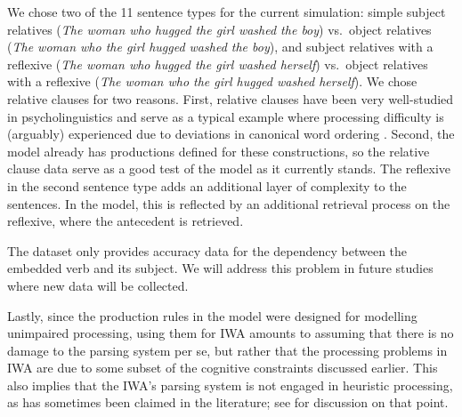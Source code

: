 \documentclass[10pt,letterpaper]{article}
\begin{document}
We chose two of the 11 sentence types for the current simulation: simple subject relatives (\textit{The woman who hugged the girl washed the boy}) vs.\ object relatives (\textit{The woman who the girl hugged washed the boy}), and subject relatives with a reflexive (\textit{The woman who hugged the girl washed herself}) vs.\ object relatives with a reflexive (\textit{The woman who the girl hugged washed herself}).
We chose relative clauses for two reasons. First, relative clauses have been very well-studied in psycholinguistics and serve as a typical example where processing difficulty is (arguably) experienced due to deviations in canonical word ordering \cite{jc92}.
Second, 
the \citeauthor{LewisVasishth2005} model already has productions defined for these constructions, so the relative clause data serve as a good test of the model as it currently stands.
The reflexive in the second sentence type adds an additional layer of complexity to the sentences. In the model, this is reflected by an additional retrieval process on the reflexive, where the antecedent is retrieved.

The  dataset only provides accuracy data for the dependency between the embedded verb and its subject. We will address this problem in future studies where new data will be collected.

Lastly, since the production rules in the model were designed for modelling unimpaired processing, using them for IWA amounts to assuming that there is no damage to the parsing system per se, but rather that the processing problems in IWA are due to some subset of the cognitive constraints discussed earlier. 
This also implies that the IWA's parsing system is not engaged in heuristic processing, as has sometimes been claimed in the literature; see  for discussion on that point.
\end{document}
